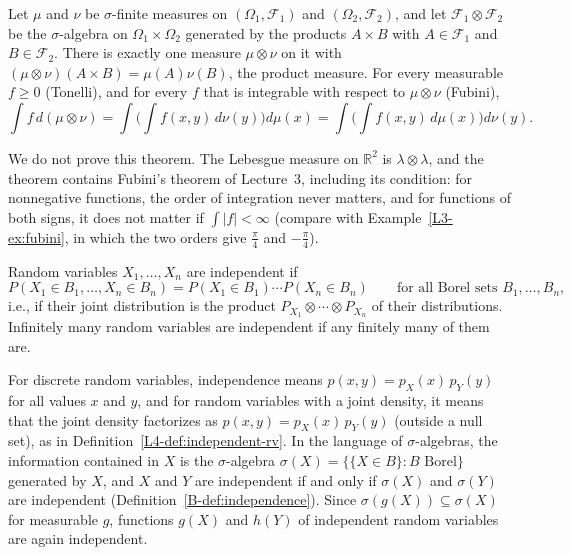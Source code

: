 \begin{theorem}\label{B-thm:fubini-tonelli}
    Let $\mu$ and $\nu$ be $\sigma$-finite measures on $(\Omega_1, \mathcal{F}_1)$ and $(\Omega_2, \mathcal{F}_2)$, and let $\mathcal{F}_1 \otimes \mathcal{F}_2$ be the $\sigma$-algebra on $\Omega_1 \times \Omega_2$ generated by the products $A \times B$ with $A \in \mathcal{F}_1$ and $B \in \mathcal{F}_2$. There is exactly one measure $\mu \otimes \nu$ on it with $(\mu \otimes \nu)(A \times B) = \mu(A)\nu(B)$, the product measure. For every measurable $f \geq 0$ (Tonelli), and for every $f$ that is integrable with respect to $\mu \otimes \nu$ (Fubini),
    \[\int f\, d(\mu \otimes \nu) = \int\bigg(\int f(x, y)\, d\nu(y)\bigg) d\mu(x) = \int\bigg(\int f(x, y)\, d\mu(x)\bigg) d\nu(y).\]
\end{theorem}

We do not prove this theorem. The Lebesgue measure on $\mathbb{R}^2$ is $\lambda \otimes \lambda$, and the theorem contains Fubini's theorem of Lecture~3, including its condition: for nonnegative functions, the order of integration never matters, and for functions of both signs, it does not matter if $\int |f| < \infty$ (compare with Example~\ref{L3-ex:fubini}, in which the two orders give $\frac{\pi}{4}$ and $-\frac{\pi}{4}$).

\begin{definition}\label{B-def:independent-rv}
    Random variables $X_1, \ldots, X_n$ are independent if
    \[P(X_1 \in B_1, \ldots, X_n \in B_n) = P(X_1 \in B_1)\cdots P(X_n \in B_n) \qquad \text{for all Borel sets } B_1, \ldots, B_n,\]
    i.e., if their joint distribution is the product $P_{X_1} \otimes \cdots \otimes P_{X_n}$ of their distributions. Infinitely many random variables are independent if any finitely many of them are.
\end{definition}

For discrete random variables, independence means $p(x, y) = p_X(x)\,p_Y(y)$ for all values $x$ and $y$, and for random variables with a joint density, it means that the joint density factorizes as $p(x, y) = p_X(x)\,p_Y(y)$ (outside a null set), as in Definition~\ref{L4-def:independent-rv}. In the language of $\sigma$-algebras, the information contained in $X$ is the $\sigma$-algebra $\sigma(X) = \{\{X \in B\} : B \text{ Borel}\}$ generated by $X$, and $X$ and $Y$ are independent if and only if $\sigma(X)$ and $\sigma(Y)$ are independent (Definition~\ref{B-def:independence}). Since $\sigma(g(X)) \subseteq \sigma(X)$ for measurable $g$, functions $g(X)$ and $h(Y)$ of independent random variables are again independent.

